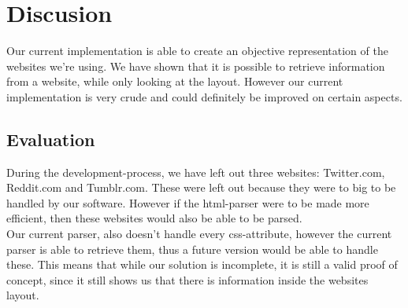 \chapter{Discusion}\label{Discusion}
Our current implementation is able to create an objective representation of the websites we're using. 
We have shown that it is possible to retrieve information from a website, while only looking at the layout. However our current implementation is very crude and could definitely be improved on certain aspects.\\

\section{Evaluation}
During the development-process, we have left out three websites: Twitter.com, Reddit.com and Tumblr.com. These were left out because they were to big to be handled by our software. However if the html-parser were to be made more efficient, then these websites would also be able to be parsed.\\
Our current parser, also doesn't handle every css-attribute, however the current parser is able to retrieve them, thus a future version would be able to handle these. This means that while our solution is incomplete, it is still a valid proof of concept, since it still shows us that there is information inside the websites layout.

